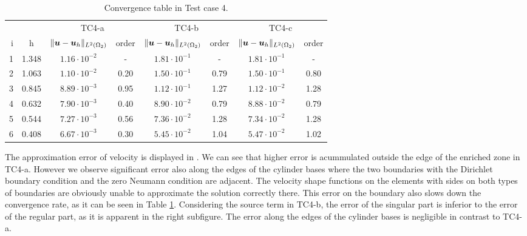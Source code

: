 \begin{table}[!htb]
\begin{center}
\bgroup
\def\arraystretch{1.2}
\setlength\tabcolsep{5pt}
\begin{tabular}{rc|cc|cc|cc}
\toprule
\multicolumn{2}{c|}{} & \multicolumn{2}{c|}{ TC4-a } & \multicolumn{2}{c|}{ TC4-b } & \multicolumn{2}{c}{TC4-c}\\ [3pt] %
i & h & $\|\mathbf{\boldsymbol{u}}-\mathbf{\boldsymbol{u}}_h\|_{L^2(\Omega_2)}$ & order & $\|\mathbf{\boldsymbol{u}}-\mathbf{\boldsymbol{u}}_h\|_{L^2(\Omega_2)}$
    & order & $\|\mathbf{\boldsymbol{u}}-\mathbf{\boldsymbol{u}}_h\|_{L^2(\Omega_2)}$ & order \\ [3pt] \midrule
1 & 1.348 &  $1.16\cdot10^{-2}$  &  -   &  $1.81\cdot10^{-1}$  &  -   &  $1.81\cdot10^{-1}$ &   -   \\
2 & 1.063 &  $1.10\cdot10^{-2}$  & 0.20 &  $1.50\cdot10^{-1}$  & 0.79 &  $1.50\cdot10^{-1}$ &  0.80 \\
3 & 0.845 &  $8.89\cdot10^{-3}$  & 0.95 &  $1.12\cdot10^{-1}$  & 1.27 &  $1.12\cdot10^{-2}$ &  1.28 \\
4 & 0.632 &  $7.90\cdot10^{-3}$  & 0.40 &  $8.90\cdot10^{-2}$  & 0.79 &  $8.88\cdot10^{-2}$ &  0.79 \\
5 & 0.544 &  $7.27\cdot10^{-3}$  & 0.56 &  $7.36\cdot10^{-2}$  & 1.28 &  $7.34\cdot10^{-2}$ &  1.28 \\
6 & 0.408 &  $6.67\cdot10^{-3}$  & 0.30 &  $5.45\cdot10^{-2}$  & 1.04 &  $5.47\cdot10^{-2}$ &  1.02 \\
\bottomrule
\end{tabular}
\caption{Convergence table in Test case 4.}
\label{tab:mh_tc4_convergence}
\egroup
\end{center}
\end{table}

The approximation error of velocity is displayed in . We can see that higher
error is acummulated outside the edge of the enriched zone in TC4-a. However we observe significant error also
along the edges of the cylinder bases where the two boundaries with the Dirichlet boundary condition and the zero Neumann condition
are adjacent. The velocity shape functions on the elements with sides on both types of boundaries are obviously unable to approximate
the solution correctly there. This error on the boundary also slows down the convergence rate, as it can be seen in Table \ref{tab:mh_tc4_convergence}.
Considering the source term in TC4-b, the error of the singular part is inferior to the error of the regular part, as it is apparent
in the right subfigure. The error along the edges of the cylinder bases is negligible in contrast to TC4-a.




